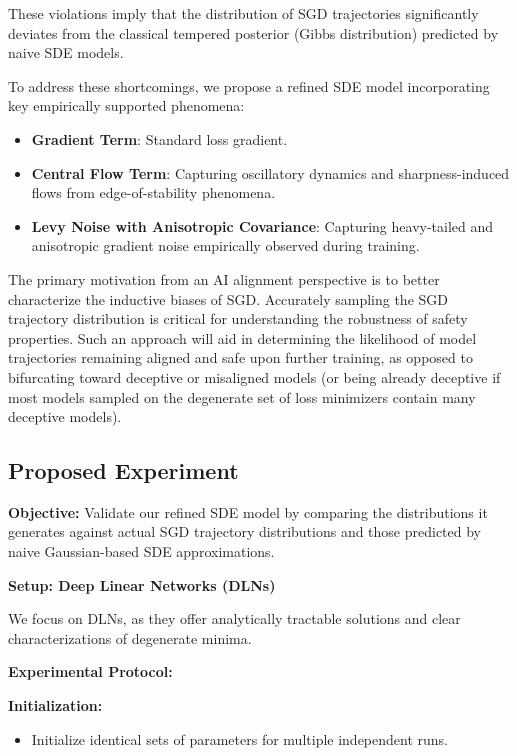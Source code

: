 \documentclass[11pt]{article}
\begin{document}
These violations imply that the distribution of SGD trajectories significantly deviates from the classical tempered posterior (Gibbs distribution) predicted by naive SDE models.

To address these shortcomings, we propose a refined SDE model incorporating key empirically supported phenomena:

\begin{itemize}
\item \textbf{Gradient Term}: Standard loss gradient.
\item \textbf{Central Flow Term}: Capturing oscillatory dynamics and sharpness-induced flows from edge-of-stability phenomena.
\item \textbf{Levy Noise with Anisotropic Covariance}: Capturing heavy-tailed and anisotropic gradient noise empirically observed during training.
\end{itemize}

The primary motivation from an AI alignment perspective is to better characterize the inductive biases of SGD. Accurately sampling the SGD trajectory distribution is critical for understanding the robustness of safety properties. Such an approach will aid in determining the likelihood of model trajectories remaining aligned and safe upon further training, as opposed to bifurcating toward deceptive or misaligned models (or being already deceptive if most models sampled on the degenerate set of loss minimizers contain many deceptive models).

\subsection{Proposed Experiment}

\textbf{Objective:} Validate our refined SDE model by comparing the distributions it generates against actual SGD trajectory distributions and those predicted by naive Gaussian-based SDE approximations.

\textbf{Setup: Deep Linear Networks (DLNs)}

We focus on DLNs, as they offer analytically tractable solutions and clear characterizations of degenerate minima.

\textbf{Experimental Protocol:}

\textbf{Initialization:}
\begin{itemize}
\item Initialize identical sets of parameters for multiple independent runs.
\end{itemize}
\end{document}
